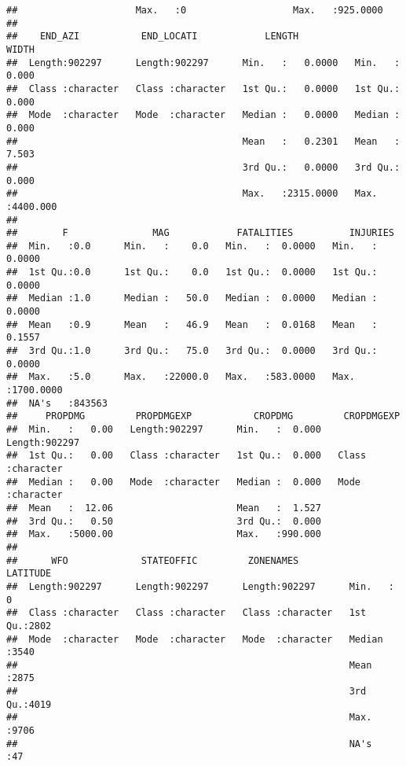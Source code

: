 \documentclass[
]{article}
\begin{document}
\begin{verbatim}
##                     Max.   :0                   Max.   :925.0000  
##                                                                   
##    END_AZI           END_LOCATI            LENGTH              WIDTH         
##  Length:902297      Length:902297      Min.   :   0.0000   Min.   :   0.000  
##  Class :character   Class :character   1st Qu.:   0.0000   1st Qu.:   0.000  
##  Mode  :character   Mode  :character   Median :   0.0000   Median :   0.000  
##                                        Mean   :   0.2301   Mean   :   7.503  
##                                        3rd Qu.:   0.0000   3rd Qu.:   0.000  
##                                        Max.   :2315.0000   Max.   :4400.000  
##                                                                              
##        F               MAG            FATALITIES          INJURIES        
##  Min.   :0.0      Min.   :    0.0   Min.   :  0.0000   Min.   :   0.0000  
##  1st Qu.:0.0      1st Qu.:    0.0   1st Qu.:  0.0000   1st Qu.:   0.0000  
##  Median :1.0      Median :   50.0   Median :  0.0000   Median :   0.0000  
##  Mean   :0.9      Mean   :   46.9   Mean   :  0.0168   Mean   :   0.1557  
##  3rd Qu.:1.0      3rd Qu.:   75.0   3rd Qu.:  0.0000   3rd Qu.:   0.0000  
##  Max.   :5.0      Max.   :22000.0   Max.   :583.0000   Max.   :1700.0000  
##  NA's   :843563                                                           
##     PROPDMG         PROPDMGEXP           CROPDMG         CROPDMGEXP       
##  Min.   :   0.00   Length:902297      Min.   :  0.000   Length:902297     
##  1st Qu.:   0.00   Class :character   1st Qu.:  0.000   Class :character  
##  Median :   0.00   Mode  :character   Median :  0.000   Mode  :character  
##  Mean   :  12.06                      Mean   :  1.527                     
##  3rd Qu.:   0.50                      3rd Qu.:  0.000                     
##  Max.   :5000.00                      Max.   :990.000                     
##                                                                           
##      WFO             STATEOFFIC         ZONENAMES            LATITUDE   
##  Length:902297      Length:902297      Length:902297      Min.   :   0  
##  Class :character   Class :character   Class :character   1st Qu.:2802  
##  Mode  :character   Mode  :character   Mode  :character   Median :3540  
##                                                           Mean   :2875  
##                                                           3rd Qu.:4019  
##                                                           Max.   :9706  
##                                                           NA's   :47    

\end{verbatim}
\end{document}
